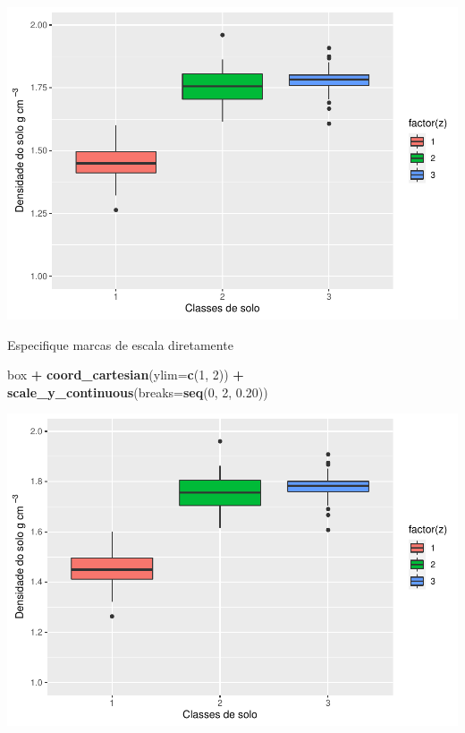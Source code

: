 \documentclass[]{book}
\newenvironment{Shaded}{\begin{snugshade}}{\end{snugshade}}
\newcommand{\DataTypeTok}[1]{\textcolor[rgb]{0.13,0.29,0.53}{#1}}
\newcommand{\DecValTok}[1]{\textcolor[rgb]{0.00,0.00,0.81}{#1}}
\newcommand{\FloatTok}[1]{\textcolor[rgb]{0.00,0.00,0.81}{#1}}
\newcommand{\KeywordTok}[1]{\textcolor[rgb]{0.13,0.29,0.53}{\textbf{#1}}}
\newcommand{\NormalTok}[1]{#1}
\newcommand{\OperatorTok}[1]{\textcolor[rgb]{0.81,0.36,0.00}{\textbf{#1}}}
\newcommand{\StringTok}[1]{\textcolor[rgb]{0.31,0.60,0.02}{#1}}
\begin{document}
\includegraphics{TudodoR_files/figure-latex/unnamed-chunk-204-1.pdf}

Especifique marcas de escala diretamente

\begin{Shaded}
\begin{Highlighting}[]
\NormalTok{box }\OperatorTok{+}\StringTok{ }\KeywordTok{coord_cartesian}\NormalTok{(}\DataTypeTok{ylim=}\KeywordTok{c}\NormalTok{(}\DecValTok{1}\NormalTok{, }\DecValTok{2}\NormalTok{)) }\OperatorTok{+}\StringTok{ }
\StringTok{    }\KeywordTok{scale_y_continuous}\NormalTok{(}\DataTypeTok{breaks=}\KeywordTok{seq}\NormalTok{(}\DecValTok{0}\NormalTok{, }\DecValTok{2}\NormalTok{, }\FloatTok{0.20}\NormalTok{))  }
\end{Highlighting}
\end{Shaded}

\includegraphics{TudodoR_files/figure-latex/unnamed-chunk-205-1.pdf}
\end{document}
